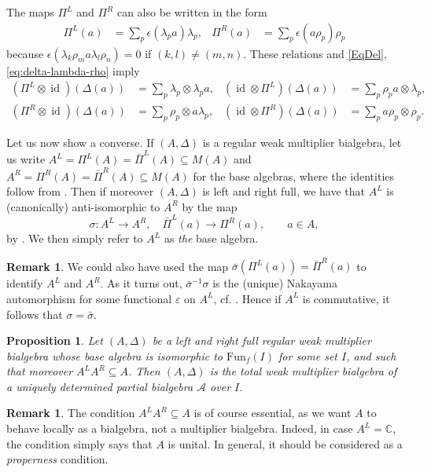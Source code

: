 \documentclass[10pt]{article}
\DeclareMathOperator{\id}{id}
\newcommand{\C}{\mathbb{C}}
\newcommand{\Fun}{\mathrm{Fun}}
\newtheorem{Prop}[Theorem]{Proposition}
\theoremstyle{definition}
\newtheorem{Rem}[Theorem]{Remark}
\numberwithin{equation}{section}
\begin{document}
 The maps $\Pi^{L}$ and $\Pi^{R}$ can also
be written in the form
\begin{align} \label{eq:pi} 
    \Pi^L(a) & = \sum_{p}\epsilon(\lambda_{p}a)\lambda_p, & \Pi^R(a) & =    \sum_{p}\epsilon(a \rho_{p}) \rho_p
\end{align}
because $\epsilon(\lambda_{k}\rho_{m} a \lambda_{l}\rho_{n})=0$  if $(k,l)\neq(m,n)$. These relations and  \eqref{EqDel}, \eqref{eq:delta-lambda-rho} imply
\begin{align} \label{eq:pi-l-delta}
  (\Pi^{L} \otimes \id)(\Delta(a)) &= \sum_{p} \lambda_{p}\otimes \lambda_{p}a, &
  (\id \otimes \Pi^{L})(\Delta(a)) &= \sum_{p} \rho_{p}a \otimes \lambda_{p}, & \\ \label{eq:pi-r-delta}
  (\Pi^{R} \otimes \id)(\Delta(a)) &= \sum_{p} \rho_{p} \otimes a\lambda_{p}, &
  (\id \otimes \Pi^{R})(\Delta(a)) &= \sum_{p} a\rho_{p} \otimes \rho_{p}.
\end{align}

Let us now show a converse. If $(A,\Delta)$ is a regular weak multiplier bialgebra, let us write $A^L = \Pi^L(A) = \bar{\Pi}^L(A)\subseteq M(A)$ and $A^R = \Pi^R(A)= \bar{\Pi}^R(A)\subseteq M(A)$ for the base algebras, where the identities follow from \cite[Theorem 3.13]{Boh1}. Then if moreover $(A,\Delta)$ is left and right full, we have that $A^L$ is (canonically) anti-isomorphic to $A^R$ by the map \[\sigma: A^L \rightarrow A^R, \quad \bar{\Pi}^L(a) \rightarrow \Pi^R(a), \qquad a\in A,\] by \cite[Lemma 4.8]{Boh1}. We then simply refer to $A^L$ as \emph{the} base algebra. 

\begin{Rem}\label{RemNak} We could also have used the map $\bar{\sigma}(\Pi^L(a)) = \bar{\Pi}^R(a)$ to identify $A^L$ and $A^R$. As it turns out, $\bar{\sigma}^{-1}\sigma$ is the (unique) Nakayama automorphism for some functional $\varepsilon$ on $A^L$, cf. \cite[Proposition 4.9]{Boh1}. Hence if $A^L$ is commutative, it follows that $\sigma = \bar{\sigma}$.
\end{Rem} 

\begin{Prop}\label{PropCharPBA} Let $(A,\Delta)$ be a left and right full regular weak multiplier bialgebra whose base algebra is isomorphic to $\Fun_f(I)$ for some set $I$, and such that moreover $A^LA^R \subseteq A$. Then $(A,\Delta)$ is the total weak multiplier bialgebra of a uniquely determined partial bialgebra $\mathscr{A}$ over $I$.
\end{Prop} 

\begin{Rem} The condition $A^LA^R \subseteq A$ is of course essential, as we want $A$ to behave locally as a bialgebra, not a multiplier bialgebra. Indeed, in case $A^L= \C$, the condition simply says that $A$ is unital. In general, it should be considered as a \emph{properness} condition. %
\end{Rem} 
\end{document}
